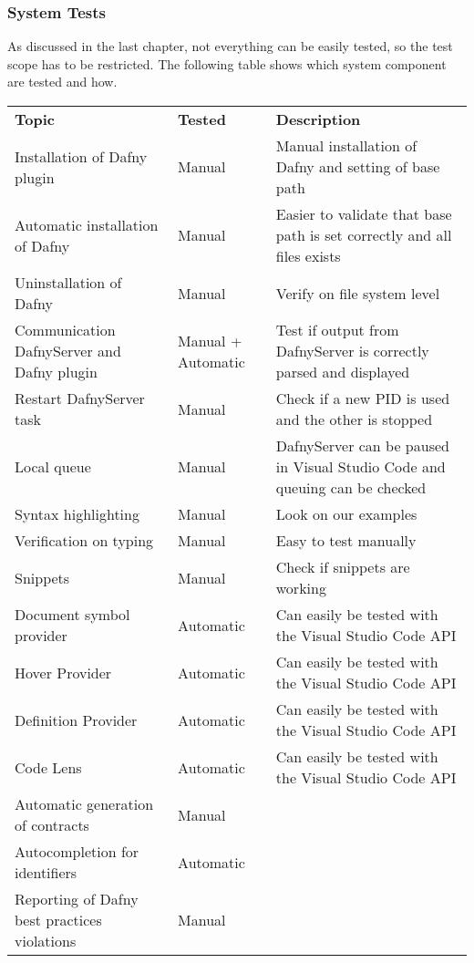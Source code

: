 \subsubsection{System Tests}
As discussed in the last chapter, not everything can be easily tested, so the test scope has to be restricted. The following table shows which system component are tested and how.
\begin{longtable}{ p{} | p{} | p{} }
	\textbf{Topic} & \textbf{Tested} & \textbf{Description}\\
	Installation of Dafny plugin & Manual & Manual installation of Dafny and setting of base path   \\
	Automatic installation of Dafny & Manual & Easier to validate that base path is set correctly and all files exists \\
	Uninstallation of Dafny & Manual & Verify on file system level\\
	Communication DafnyServer and Dafny plugin & Manual + Automatic & Test if output from DafnyServer is correctly parsed and displayed\\
	Restart DafnyServer task & Manual & Check if a new PID is used and the other is stopped\\
	Local queue & Manual & DafnyServer can be paused in Visual Studio Code and queuing can be checked \\
	Syntax highlighting & Manual & Look on our examples \\
	Verification on typing & Manual & Easy to test manually\\
	Snippets & Manual & Check if snippets are working\\
	Document symbol provider & Automatic & Can easily be tested with the Visual Studio Code API \\
	Hover Provider & Automatic & Can easily be tested with the Visual Studio Code API\\
	Definition Provider & Automatic & Can easily be tested with the Visual Studio Code API  \\
	Code Lens & Automatic & Can easily be tested with the Visual Studio Code API\\
	Automatic generation of contracts & Manual & \todo{add desc} \\
	Autocompletion for identifiers & Automatic & \todo{add desc} \\
	Reporting of Dafny best practices violations & Manual & \todo{add desc} \\
\end{longtable}



